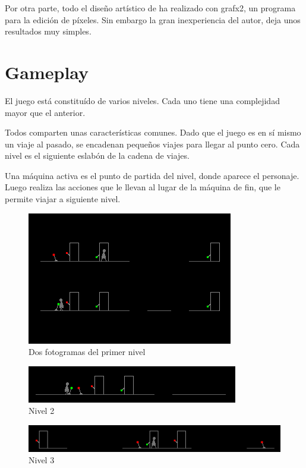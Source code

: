 \documentclass[11pt,a4paper]{article}
\begin{document}
Por otra parte, todo el diseño artístico de ha realizado con grafx2, un programa 
para la edición de píxeles. Sin embargo la gran inexperiencia del autor, deja 
unos resultados muy simples.

\section{Gameplay}

El juego está constituído de varios niveles. Cada uno tiene una complejidad 
mayor que el anterior.

Todos comparten unas características comunes. Dado que el juego es en sí mismo 
un viaje al pasado, se encadenan pequeños viajes para llegar al punto cero. Cada 
nivel es el siguiente eslabón de la cadena de viajes.

Una máquina activa es el punto de partida del nivel, donde aparece el personaje. 
Luego realiza las acciones que le llevan al lugar de la máquina de fin, que le 
permite viajar a siguiente nivel.

\begin{figure}[h]
\centering
\includegraphics[scale=0.8]{level1.png}
\caption{Dos fotogramas del primer nivel}
\label{fig:level1}
\end{figure}

\begin{figure}[H]
\centering
\includegraphics[scale=0.8]{l2.png}
\caption{Nivel 2}
\label{fig:level2}
\end{figure}

\begin{figure}[H]
\centering
\includegraphics[scale=0.8]{l3.png}
\caption{Nivel 3}
\label{fig:level3}
\end{figure}
\end{document}
